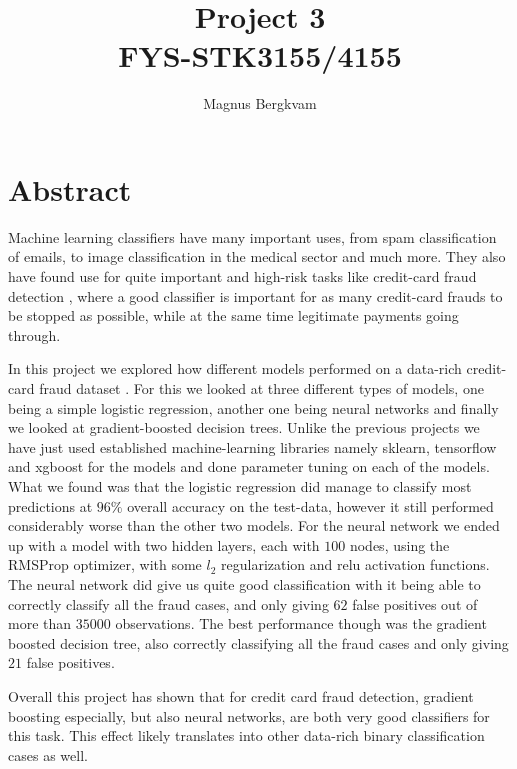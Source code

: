 \documentclass{article}
\title{Project 3 \\ FYS-STK3155/4155}
\author{Magnus Bergkvam}
\begin{document}
\maketitle


\section{Abstract}
Machine learning classifiers have many important uses, from spam classification
of emails, to image classification in the medical sector and much more. They
also have found use for quite important and high-risk tasks like credit-card
fraud detection \cite{creditcardfraud}, where a good classifier is important
for as many credit-card frauds to be stopped as possible, while at the same
time legitimate payments going through.

In this project we explored how different models performed on a data-rich
credit-card fraud dataset \cite{kaggleccdata}. For this we looked at three
different types of models, one being a simple logistic regression, another one
being neural networks and finally we looked at gradient-boosted decision trees.
Unlike the previous projects we have just used established machine-learning
libraries namely sklearn, tensorflow and xgboost for the models and done
parameter tuning on each of the models. What we found was that the logistic
regression did manage to classify most predictions at $96\%$ overall accuracy
on the test-data, however it still performed considerably worse than the other
two models. For the neural network we ended up with a model with two hidden
layers, each with $100$ nodes, using the RMSProp optimizer, with some $l_2$
regularization and relu activation functions. The neural network did give us
quite good classification with it being able to correctly classify all the
fraud cases, and only giving $62$ false positives out of more than $35 000$
observations. The best performance though was the gradient boosted decision
tree, also correctly classifying all the fraud cases and only giving $21$ false
positives.

Overall this project has shown that for credit card fraud detection, gradient
boosting especially, but also neural networks, are both very good classifiers
for this task. This effect likely translates into other data-rich binary
classification cases as well.
\end{document}
